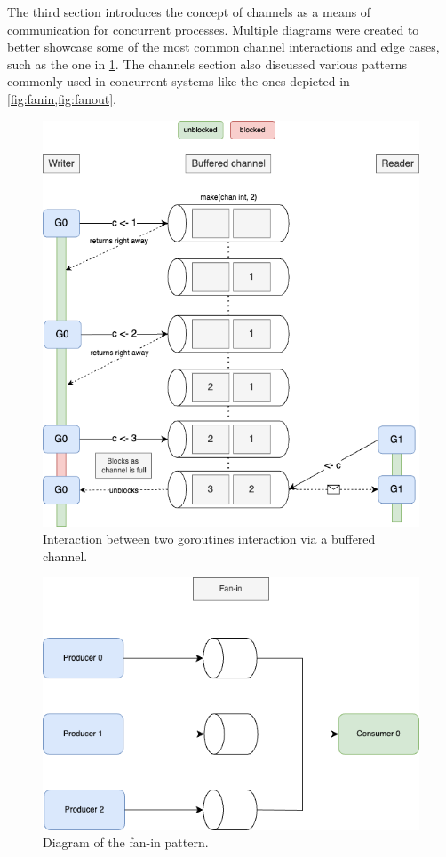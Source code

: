\documentclass[
  digital,
  color,
  oneside,
  nosansbold,
  nocolorbold,
  nolof,
  nolot,
]{fithesis4}
\begin{document}
The third section introduces the concept of channels as a means of communication for concurrent processes. Multiple diagrams were created to better showcase some of the most common channel interactions and edge cases, such as the one in \cref{fig:goroutine-interactions}. The channels section also discussed various patterns commonly used in concurrent systems like the ones depicted in \cref{fig:fanin,fig:fanout}.

\begin{figure}[H]
    \centering
    \includegraphics[width=12cm]{figures/buffered-full.png}
    \caption{Interaction between two goroutines interaction via a buffered channel.}
    \label{fig:goroutine-interactions}
\end{figure}

\begin{figure}[H]
    \centering
    \includegraphics[width=12cm]{figures/fanin.png}
    \caption{Diagram of the fan-in pattern.}
    \label{fig:fanin}
\end{figure}
\end{document}
